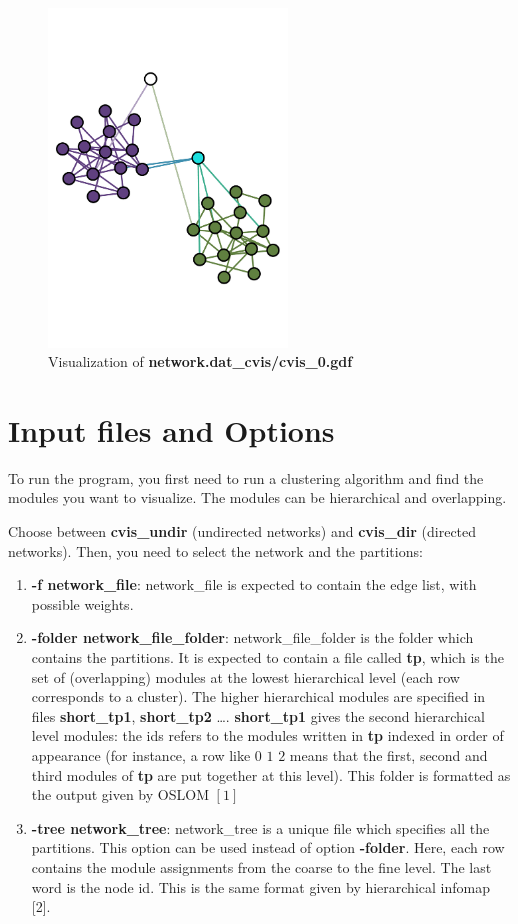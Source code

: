 \documentclass[11pt]{article}
\begin{document}
\begin{figure}[h!]
\begin{center}
\includegraphics[width=2.5in]{network.pdf}
\caption{Visualization of  \textbf{network.dat\_cvis/cvis\_0.gdf} }
\end{center}
\end{figure}




\section{Input files and Options}

To run the program, you first need to run a clustering algorithm and find the modules you want to visualize. The modules can be hierarchical and overlapping. 

Choose between \textbf{cvis\_undir} (undirected networks) and \textbf{cvis\_dir} (directed networks).
Then, you need to select the network and the partitions:


\begin{enumerate}
  \item \textbf{-f network\_file}: network\_file is expected to contain the edge list, with possible weights.   
  \item \textbf{-folder network\_file\_folder}:  network\_file\_folder is the folder which contains the partitions. It is expected to contain a file called \textbf{tp},  which is the set of (overlapping) modules at the lowest hierarchical level (each row corresponds to a cluster). The higher hierarchical modules are specified in files \textbf{short\_tp1}, {\bf short\_tp2} \dots. \textbf{short\_tp1} gives the second hierarchical level modules: the ids refers to the modules written in \textbf{tp} indexed in order of appearance (for instance, a row like $0\,\,1\,\,2$ means that the first, second and third modules of \textbf{tp} are put together at this level). This folder is formatted as the output given by OSLOM $[1]$
   \item \textbf{-tree network\_tree}:  network\_tree is a unique file which specifies all the partitions. This option can be used instead of  option  \textbf{-folder}. Here, each row contains the module assignments from the coarse to the fine level. The last word is the node id. This is the same format given by hierarchical infomap [2]. 
\end{enumerate}
\end{document}
